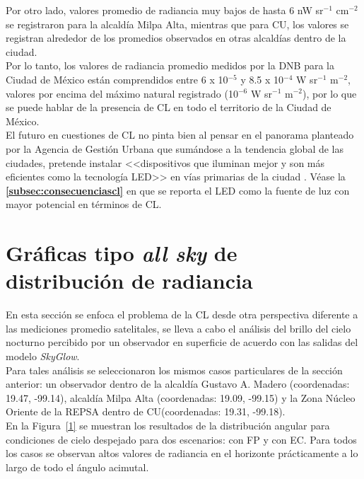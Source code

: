 \newpage

Por otro lado, valores promedio de radiancia muy bajos de hasta 6 nW sr$^{-1}$  cm$^{-2}$ se registraron para la alcaldía Milpa Alta, mientras que para CU, los valores se registran alrededor de los promedios observados en otras alcaldías dentro de la ciudad.\\

Por lo tanto, los valores de radiancia promedio medidos por la DNB para la Ciudad de México están comprendidos entre 6 x 10$^{-5}$ y 8.5 x 10$^{-4}$ W sr$^{-1}$ m$^{-2}$, valores por encima del máximo natural registrado (10$^{-6}$ W sr$^{-1}$  m$^{-2}$), por lo que se puede hablar de la presencia de CL en todo el territorio de la Ciudad de México.\\ 

El futuro en cuestiones de CL no pinta bien al pensar en el panorama planteado por la Agencia de Gestión Urbana que sumándose a la tendencia global de las ciudades, pretende instalar <<dispositivos que iluminan mejor y son más eficientes como la tecnología LED>> en vías primarias de la ciudad \citep{Universal2017}. Véase la \textbf{\autoref{subsec:consecuenciascl}} en que se reporta el LED como la fuente de luz con mayor potencial en términos de CL.\\ 


\section{Gráficas tipo \textit{all sky} de distribución de radiancia}

En esta sección se enfoca el problema de la CL desde otra perspectiva diferente a las mediciones promedio satelitales, se lleva a cabo el análisis del brillo del cielo nocturno percibido por un observador en superficie de acuerdo con las salidas del modelo \textit{SkyGlow}.\\ 

Para tales análisis se seleccionaron los mismos casos particulares de la sección anterior: un observador dentro de la alcaldía Gustavo A. Madero (coordenadas: 19.47\grad, -99.14\grad), alcaldía Milpa Alta (coordenadas: 19.09\grad, -99.15\grad) y la Zona Núcleo Oriente de la REPSA dentro de CU(coordenadas: 19.31\grad, -99.18\grad).\\

En la Figura~\ref{1} se muestran los resultados de la distribución angular para condiciones de cielo despejado para dos escenarios: con FP y con EC. Para todos los casos se observan altos valores de radiancia en el horizonte prácticamente a lo largo de todo el ángulo acimutal.\\

